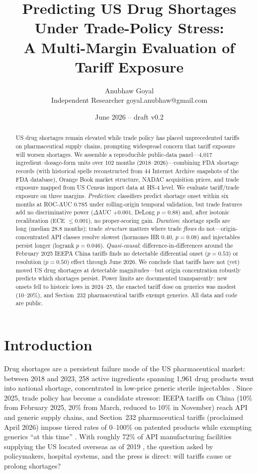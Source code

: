 \documentclass[11pt]{article}
\title{Predicting US Drug Shortages Under Trade-Policy Stress:\\
A Multi-Margin Evaluation of Tariff Exposure}
\author{Anubhaw Goyal\\ \small Independent Researcher \quad goyal.anubhaw@gmail.com}
\date{June 2026 \;--\; draft v0.2}
\begin{document}
\maketitle

\begin{abstract}
US drug shortages remain elevated while trade policy has placed unprecedented tariffs on pharmaceutical supply chains, prompting widespread concern that tariff exposure will worsen shortages. We assemble a reproducible public-data panel---4{,}017 ingredient--dosage-form units over 102 months (2018--2026)---combining FDA shortage records (with historical spells reconstructed from 44 Internet Archive snapshots of the FDA database), Orange Book market structure, NADAC acquisition prices, and trade exposure mapped from US Census import data at HS-4 level. We evaluate tariff/trade exposure on three margins. \emph{Prediction}: classifiers predict shortage onset within six months at ROC-AUC 0.785 under rolling-origin temporal validation, but trade features add no discriminative power ($\Delta$AUC $+0.001$, DeLong $p=0.88$) and, after isotonic recalibration (ECE $\le 0.001$), no proper-scoring gain. \emph{Duration}: shortage spells are long (median 28.8 months); trade \emph{structure} matters where trade \emph{flows} do not---origin-concentrated API classes resolve slowest (hormones HR 0.40, $p=0.08$) and injectables persist longer (logrank $p=0.046$). \emph{Quasi-causal}: difference-in-differences around the February 2025 IEEPA China tariffs finds no detectable differential onset ($p=0.53$) or resolution ($p=0.50$) effect through June 2026. We conclude that tariffs have not (yet) moved US drug shortages at detectable magnitudes---but origin concentration robustly predicts which shortages persist. Power limits are documented transparently: new onsets fell to historic lows in 2024--25, the enacted tariff dose on generics was modest (10--20\%), and Section~232 pharmaceutical tariffs exempt generics. All data and code are public.
\end{abstract}

\section{Introduction}
Drug shortages are a persistent failure mode of the US pharmaceutical market: between 2018 and 2023, 258 active ingredients spanning 1{,}961 drug products went into national shortage, concentrated in low-price generic sterile injectables \citep{aspe2025}. Since 2025, trade policy has become a candidate stressor: IEEPA tariffs on China (10\% from February 2025, 20\% from March, reduced to 10\% in November) reach API and generic supply chains, and Section~232 pharmaceutical tariffs (proclaimed April 2026) impose tiered rates of 0--100\% on patented products while exempting generics ``at this time'' \citep{whitehouse2026}. With roughly 72\% of API manufacturing facilities supplying the US located overseas as of 2019 \citep{woodcock2019}, the question asked by policymakers, hospital systems, and the press is direct: will tariffs cause or prolong shortages?
\end{document}
